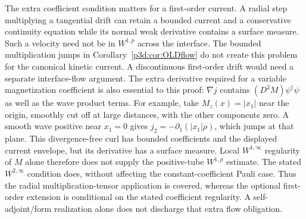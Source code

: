 \documentclass[11pt]{article}
\numberwithin{equation}{section}
\theoremstyle{definition}
\theoremstyle{remark}
\begin{document}
The extra coefficient condition matters for a first-order current.
A radial step multiplying a tangential drift can retain a bounded
current and a conservative continuity equation while its normal weak
derivative contains a surface measure. Such a velocity need not be
in $W^{1,p}$ across the interface. The bounded multiplication jumps
in Corollary~\ref{p3d:cor:OLDflow} do not create this problem for the
canonical kinetic current. A discontinuous first-order drift would
need a separate interface-flow argument. The extra derivative required
for a variable magnetization coefficient is also essential to this proof:
$\nabla j$ contains $(D^2M)\psi^\dagger\psi$ as well as the wave
product terms. For example, take $M_z(x)=|x_1|$ near the origin,
smoothly cut off at large distances, with the other components zero.
A smooth wave positive near $x_1=0$ gives
$j_2=-\partial_1(|x_1|\rho)$, which jumps at that plane.
This divergence-free curl has bounded coefficients and the displayed
current envelope, but its derivative has a surface measure.
Local $W^{1,\infty}$ regularity of $M$ alone therefore does not supply
the positive-tube $W^{1,p}$ estimate. The stated $W^{2,\infty}$
condition does, without affecting the constant-coefficient Pauli case.
Thus the radial multiplication-tensor application is covered,
whereas the optional first-order extension is conditional on the
stated coefficient regularity. A self-adjoint/form realization alone
does not discharge that extra flow obligation.
\end{document}
